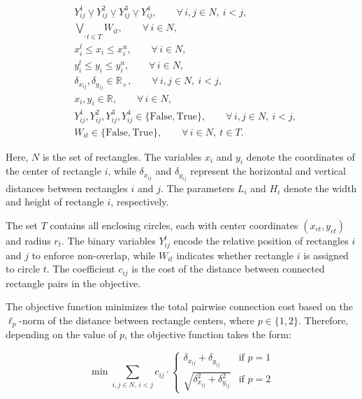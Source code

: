 \documentclass[11pt]{article}
\begin{document}
\begin{equation}
\begin{aligned}
& Y_{ij}^1 \underline{\vee} Y_{ij}^2 \underline{\vee} Y_{ij}^3 \underline{\vee} Y_{ij}^4,
\qquad \forall\, i,j \in N,\ i<j,
\\
& \underset{t \in T}{\underline{\bigvee}} W_{it},
\qquad \forall\, i \in N,
\\
& x_i^l \le x_i \le x_i^u,
\qquad \forall\, i \in N,
\\
& y_i^l \le y_i \le y_i^u,
\qquad \forall\, i \in N,
\\
& \delta_{x_{ij}}, \delta_{y_{ij}} \in \mathbb{R}_+,
\qquad \forall\, i,j \in N,\ i<j,
\\
& x_i, y_i \in \mathbb{R},
\qquad \forall\, i \in N,
\\
& Y_{ij}^1, Y_{ij}^2, Y_{ij}^3, Y_{ij}^4 \in \{\mathrm{False}, \mathrm{True}\},
\qquad \forall\, i,j \in N,\ i<j,
\\
& W_{it} \in \{\mathrm{False}, \mathrm{True}\},
\qquad \forall\, i \in N,\ t \in T.
\end{aligned}
\end{equation}
\endgroup

Here, \(N\) is the set of rectangles. The variables \(x_i\) and \(y_i\) denote the coordinates of the center of rectangle \(i\), while \(\delta_{x_{ij}}\) and \(\delta_{y_{ij}}\) represent the horizontal and vertical distances between rectangles \(i\) and \(j\).
The parameters \(L_i\) and \(H_i\) denote the width and height of rectangle \(i\), respectively.

The set \(T\) contains all enclosing circles, each with center coordinates \((x_{ct}, y_{ct})\) and radius \(r_t\).
The binary variables \(Y_{ij}^t\) encode the relative position of rectangles \(i\) and \(j\) to enforce non-overlap, while \(W_{it}\) indicates whether rectangle \(i\) is assigned to circle \(t\).
The coefficient \(c_{ij}\) is the cost of the distance between connected rectangle pairs in the objective.


The objective function minimizes the total pairwise connection cost based on the \(\ell_p\)-norm of the distance between rectangle centers, where \(p \in \{1,2\}\).
Therefore, depending on the value of \(p\), the objective function takes the form:

\[
\min \sum_{i,j \in N,\, i < j} c_{ij} \cdot 
\begin{cases}
\delta_{x_{ij}} + \delta_{y_{ij}} & \text{if } p = 1 \\
\sqrt{\delta_{x_{ij}}^2 + \delta_{y_{ij}}^2} & \text{if } p = 2
\end{cases}
\]
\end{document}
